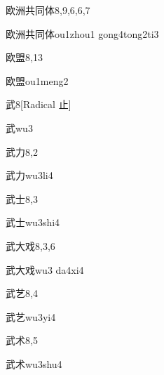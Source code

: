 \begin{entry}{欧洲共同体}{8,9,6,6,7}
  \begin{phonetics}{欧洲共同体}{ou1zhou1 gong4tong2ti3}
  \end{phonetics}
\end{entry}

\begin{entry}{欧盟}{8,13}
  \begin{phonetics}{欧盟}{ou1meng2}
  \end{phonetics}
\end{entry}

\begin{entry}{武}{8}[Radical 止]
  \begin{phonetics}{武}{wu3}
  \end{phonetics}
\end{entry}

\begin{entry}{武力}{8,2}
  \begin{phonetics}{武力}{wu3li4}
  \end{phonetics}
\end{entry}

\begin{entry}{武士}{8,3}
  \begin{phonetics}{武士}{wu3shi4}
  \end{phonetics}
\end{entry}

\begin{entry}{武大戏}{8,3,6}
  \begin{phonetics}{武大戏}{wu3 da4xi4}
  \end{phonetics}
\end{entry}

\begin{entry}{武艺}{8,4}
  \begin{phonetics}{武艺}{wu3yi4}
  \end{phonetics}
\end{entry}

\begin{entry}{武术}{8,5}
  \begin{phonetics}{武术}{wu3shu4}
  \end{phonetics}
\end{entry}

